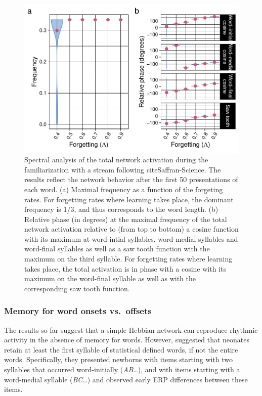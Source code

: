 \documentclass[
]{article}
\begin{document}
\begin{figure}
\includegraphics[width=1\linewidth]{tp_model_entrainment_files/figure-latex/basic-experiment-global-print-freq-phase-plot-1} \caption{Spectral analysis of the total network activation during the familiarization with a stream following cite{Saffran-Science}. The results reflect the network behavior after the first 50 presentations of each word. (a) Maximal frequency as a function of the forgeting rates. For forgetting rates where learning takes place, the dominant frequency is 1/3, and thus corresponds to the word length. (b) Relative phase (in degrees) at the maximal frequency of the total network activation relative to (from top to bottom) a cosine function with its maximum at word-intial syllables, word-medial syllables and word-final syllables as well as a saw tooth function with the maximum on the third syllable. For forgetting rates where learning takes place, the total activation is in phase with a cosine with its maximum on the word-final syllable as well as with the corresponding saw tooth function.}\label{fig:basic-experiment-global-print-freq-phase-plot}
\end{figure}

\hypertarget{memory-for-word-onsets-vs.-offsets-flo2022}{%
\subsubsection{\texorpdfstring{Memory for word onsets vs.~offsets
\citep{Flo2022}}{Memory for word onsets vs.~offsets {[}@Flo2022{]}}}\label{memory-for-word-onsets-vs.-offsets-flo2022}}

The results so far suggest that a simple Hebbian network can reproduce
rhythmic activity in the absence of memory for words. However,
\citep{Flo2022} suggested that neonates retain at least the first
syllable of statistical defined words, if not the entire words.
Specifically, they presented newborns with items starting with two
syllables that occurred word-initially (\emph{AB}\ldots), and with items
starting with a word-medial syllable (\emph{BC}\ldots) and observed
early ERP differences between these items.
\end{document}
